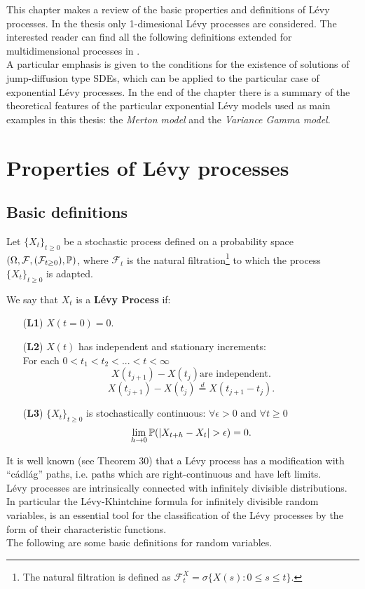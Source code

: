 This chapter makes a review of the basic properties and definitions of Lévy processes.
In the thesis only 1-dimesional Lévy processes are considered. 
The interested reader can find all the following definitions extended for multidimensional processes in \cite{Applebaum}.\\ 
A particular emphasis is given to the conditions for the existence of solutions of jump-diffusion type SDEs, 
which can be applied to the particular case of exponential Lévy processes.
In the end of the chapter there is a summary of the theoretical features of the particular exponential Lévy models used as main examples in this thesis: 
the \emph{Merton model} and the \emph{Variance Gamma model}.

\section{Properties of Lévy processes}

\subsection{Basic definitions}

Let $\{X_t\}_{t \ge 0}$ be a stochastic process defined on a probability space $(\Omega,\mathcal{F},(\mathcal{F}_{t \ge 0}),\mathbb{P})$, 
where $\mathcal{F}_t$ is the natural filtration\footnote{The natural filtration is defined as $\mathcal{F}_{t}^X = \sigma\{X(s) :
0\leq s \leq t\} $.} to which the process $\{X_t\}_{t \ge 0}$ is adapted.\\ 
\begin{Definition}\label{LevyDef}
We say that $X_t$ is a \textbf{Lévy Process} if:
\begin{itemize}
 \item[(\textbf{L1})] $X(t=0) = 0$.
 \item[(\textbf{L2})] $X(t)$ has independent and stationary increments:\\ For each $0<t_1<t_2 <... <t<\infty$
   $$ X(t_{j+1})-X(t_j) \mbox{are independent.} $$
   $$ X(t_{j+1})-X(t_j) \overset{d}{=} X(t_{j+1}- t_{j}). $$ 
 \item[(\textbf{L3})] $\{X_t\}_{t \ge 0}$ is stochastically continuous: $\forall \epsilon > 0 $ and $\forall t \ge 0$  $$\lim_{h\to 0} \mathbb{P}(|X_{t+h}-X_t| > \epsilon)=0. $$ 
\end{itemize}
\end{Definition}
It is well known (see \cite{Protter} Theorem 30) that a Lévy process has a modification with ``cádlág''
paths, i.e. paths which are right-continuous and have left limits. \\
Lévy processes are intrinsically connected with infinitely divisible distributions. In particular the Lévy-Khintchine formula 
for infinitely divisible random variables, is an essential tool for the classification of the Lévy processes by the form of their
characteristic functions.\\
The following are some basic definitions for random variables.  

